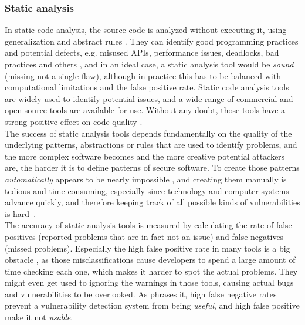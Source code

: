 \documentclass[
a4paper,
pagesize,
pdftex,
12pt,
twoside, %
BCOR=5mm, %
ngerman,
fleqn,
final,
]{scrartcl}
\begin{document}
	\subsubsection{Static analysis}
	In static code analysis, the source code is analyzed without executing it, using generalization and abstract rules \cite{Ghaffarian.2017}. They can identify good programming practices and potential defects, e.g. misused APIs, performance issues, deadlocks, bad practices and others \cite{Venkatasubramanyam.2014}, and in an ideal case, a static analysis tool would be \textit{sound} (missing not a single flaw), although in practice this has to be balanced with computational limitations and the false positive rate. Static code analysis tools are widely used to identify potential issues, and a wide range of commercial and open-source tools are available for use. Without any doubt, those tools have a strong positive effect on code quality \cite{Liu.2018}. \\
	The success of static analysis tools depends fundamentally on the quality of the underlying patterns, abstractions or rules that are used to identify problems, and the more complex software becomes and the more creative potential attackers are, the harder it is to define patterns of secure software. To create those patterns \textit{automatically} appears to be nearly impossible \cite{Rolim.2018, Yamaguchi.2012}, and creating them manually is tedious and time-consuming, especially since technology and computer systems advance quickly, and therefore keeping track of all possible kinds of vulnerabilities is hard~\cite{Ma.2017}.\\
	The accuracy of static analysis tools is measured by calculating the rate of false positives (reported problems that are in fact not an issue) and false negatives (missed problems). Especially the high false positive rate in many tools is a big obstacle \cite[S.~1]{Liu.2018}, as those misclassifications cause developers to spend a large amount of time checking each one, which makes it harder to spot the actual problems. They might even get used to ignoring the warnings in those tools, causing actual bugs and vulnerabilities to be overlooked. As \cite{Li.2005} phrases it, high false negative rates prevent a vulnerability detection system from being \textit{useful}, and high false positive make it not \textit{usable}.\\
	
\end{document}
